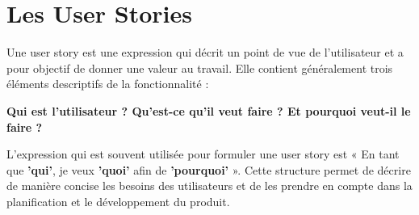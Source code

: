 


\section{Les User Stories}
Une user story est une expression qui décrit un point de vue de l'utilisateur et a pour objectif de donner une valeur au travail. Elle contient généralement trois éléments descriptifs de la fonctionnalité : 

  \textbf{Qui est l'utilisateur ? Qu'est-ce qu'il veut faire ? Et pourquoi veut-il le faire ?}

L'expression qui est souvent utilisée pour formuler une user story est « En tant que \textbf{'qui'}, je veux \textbf{'quoi'} afin de \textbf{'pourquoi'} ». Cette structure permet de décrire de manière concise les besoins des utilisateurs et de les prendre en compte dans la planification et le développement du produit.


